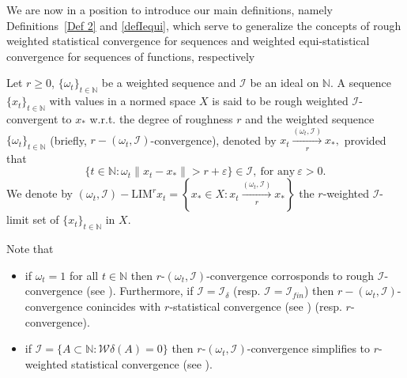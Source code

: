 \documentclass[reqno]{amsart}
\begin{document}
We are now in a position to introduce our main definitions, namely Definitions~\ref{Def 2} and \ref{defIequi}, which serve to generalize the concepts of rough weighted statistical convergence for sequences and weighted equi-statistical convergence for sequences of functions, respectively
\begin{definition}\label{Def 2}
Let $r\geq 0$, $\{\omega_t\}_{t\in\mathbb{N}}$ be a weighted sequence and $\mathcal{I}$ be an ideal on $\mathbb{N}$. A sequence $\{x_t\}_{t\in\mathbb{N}}$ with values in a normed space $X$ is said to be rough weighted  $\mathcal{I}$-convergent to $x_*$ w.r.t. the degree of roughness $r$ and the weighted sequence $\{\omega_t\}_{t\in\mathbb{N}}$ (briefly, $r-(\omega_t,\mathcal{I})$-convergence), denoted by $x_t\xrightarrow[r]{(\omega_t,\mathcal{I})} x_*,$ provided that
$$\{t\in\mathbb{N}:\omega_t\|x_t-x_*\|> r+\varepsilon\}\in\mathcal{I},~\mbox{for any}~\varepsilon>0.$$ 
We denote by $(\omega_t,\mathcal{I})-\text{LIM}^rx_t=\left\{x_*\in X:x_t\xrightarrow[r]{(\omega_t,\mathcal{I})} x_* \right\}$ the $r$-weighted $\mathcal{I}$-limit set of $\{x_t\}_{t\in\mathbb{N}}$ in $X$.
\end{definition}

 \begin{remark} Note that
 	\begin{itemize}
\item [(i)] if $\omega_t=1$ for all $t\in\mathbb{N}$  then $r$-$(\omega_t,\mathcal{I})$-convergence corrosponds to rough $\mathcal{I}$-convergence (see \cite{dundar2014rough,Dundar2016}). Furthermore, if $\mathcal{I}=\mathcal{I}_{\delta}$ (resp. $\mathcal{I}=\mathcal{I}_{fin}$)   then $r-(\omega_t,\mathcal{I})$-convergence conincides with   $r$-statistical convergence  (see \cite{aytar2008rough}) (resp. $r$-convergence).
\item [(ii)] if $\mathcal{I}=\{A\subset\mathbb{N}:\mathcal{W}\delta(A)=0\}$ then $r$-$(\omega_t,\mathcal{I})$-convergence simplifies to $r$-weighted statistical convergence (see \cite{das2018characterization,ghosal2021rough}).
\end{itemize}
 \end{remark}
\end{document}
